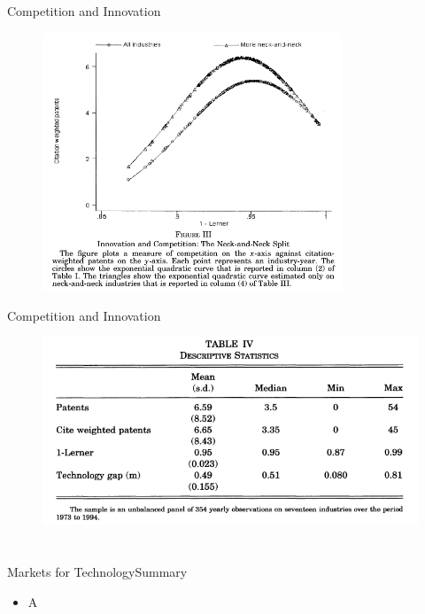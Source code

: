 \documentclass{beamer}
\begin{document}
\begin{frame}{Competition and Innovation}{}
\begin{figure}[h]
\begin{centering}
  \includegraphics[width=0.8\textwidth]{0206}
   \label{fig:0206}
\end{centering}
\end{figure}
\end{frame}

\begin{frame}{Competition and Innovation}{}
\begin{figure}[h]
\begin{centering}
  \includegraphics[width=\textwidth]{0207}
   \label{fig:0207}
\end{centering}
\end{figure}
\end{frame}


\section{\cite{Arora2001}}
\begin{frame}{Markets for Technology}{Summary}
\begin{itemize}
\item{A}
\end{itemize}
\end{frame}
\end{document}
